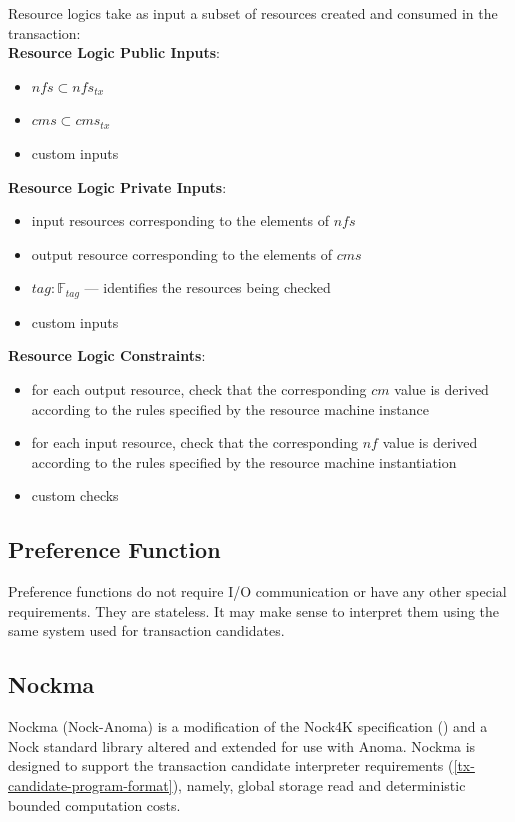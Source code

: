 Resource logics take as input a subset of resources created and consumed in the transaction:\\

\textbf{Resource Logic Public Inputs}: 

\begin{itemize}
    \item $nfs \subset nfs_{tx}$
    \item $cms \subset cms_{tx}$
    \item custom inputs
\end{itemize}

\textbf{Resource Logic Private Inputs}:
\begin{itemize}
    \item input resources corresponding to the elements of $nfs$
    \item output resource corresponding to the elements of $cms$
    \item $tag: \mathbb{F}_{tag}$ —  identifies the resources being checked
    \item custom inputs
\end{itemize}

\textbf{Resource Logic Constraints}:
\begin{itemize}
    \item for each output resource, check that the corresponding $cm$ value is derived according to the rules specified by the resource machine instance
    \item for each input resource, check that the corresponding $nf$ value is derived according to the rules specified by the resource machine instantiation
    \item custom checks
\end{itemize}

\subsection{Preference Function} %
 Preference functions do not require I/O communication or have any other special requirements. They are stateless. It may make sense to interpret them using the same system used for transaction candidates.

\subsection{Nockma}
Nockma (Nock-Anoma) is a modification of the Nock4K specification (\cite{nock4k}) and a Nock standard library altered and extended for use with Anoma. Nockma is designed to support the transaction candidate interpreter requirements (\ref{tx-candidate-program-format}), namely, global storage read and deterministic bounded computation costs.

